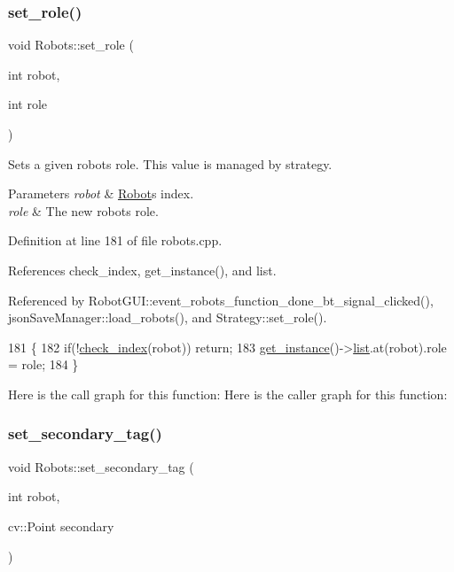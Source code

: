 \subsubsection{\texorpdfstring{set\+\_\+role()}{set\_role()}}
{\footnotesize\ttfamily void Robots\+::set\+\_\+role (\begin{DoxyParamCaption}\item[{int}]{robot,  }\item[{int}]{role }\end{DoxyParamCaption})\hspace{0.3cm}{\ttfamily [static]}}

Sets a given robot\textquotesingle{}s role. This value is managed by strategy. 
\begin{DoxyParams}{Parameters}
{\em robot} & \hyperlink{struct_robots_1_1_robot}{Robot}\textquotesingle{}s index. \\
\hline
{\em role} & The new robot\textquotesingle{}s role. \\
\hline
\end{DoxyParams}


Definition at line 181 of file robots.\+cpp.



References check\+\_\+index, get\+\_\+instance(), and list.



Referenced by Robot\+G\+U\+I\+::event\+\_\+robots\+\_\+function\+\_\+done\+\_\+bt\+\_\+signal\+\_\+clicked(), json\+Save\+Manager\+::load\+\_\+robots(), and Strategy\+::set\+\_\+role().


\begin{DoxyCode}
181                                          \{
182     \textcolor{keywordflow}{if}(!\hyperlink{robots_8hpp_ae3e6ae8f87cdc750c0b99bc609d9ae43}{check\_index}(robot)) \textcolor{keywordflow}{return};
183     \hyperlink{class_robots_a589bce74db5f34af384952d48435168f}{get\_instance}()->\hyperlink{class_robots_a2c6b77265028f82a4342ca1ef15ed305}{list}.at(robot).role = role;
184 \}
\end{DoxyCode}
Here is the call graph for this function\+:
Here is the caller graph for this function\+:
\mbox{\label{class_robots_a40620e7ef7a3003736ab1c0b82c2b3b2}} 
\subsubsection{\texorpdfstring{set\+\_\+secondary\+\_\+tag()}{set\_secondary\_tag()}}
{\footnotesize\ttfamily void Robots\+::set\+\_\+secondary\+\_\+tag (\begin{DoxyParamCaption}\item[{int}]{robot,  }\item[{cv\+::\+Point}]{secondary }\end{DoxyParamCaption})\hspace{0.3cm}{\ttfamily [static]}}

